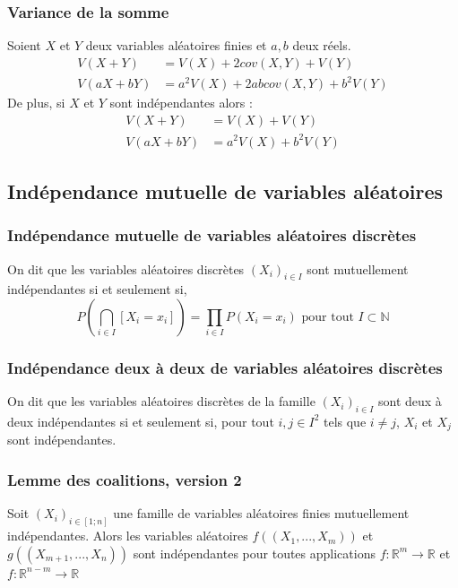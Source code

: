         \subsubsection{Variance de la somme}
            Soient $X$ et $Y$ deux variables aléatoires finies et $a, b$ deux réels.
            \begin{align*}
                V(X + Y) &= V(X) + 2cov(X, Y) + V(Y)\\
                V(aX + bY) &= a^2V(X) + 2abcov(X, Y) + b^2V(Y)
            \end{align*}
            De plus, si $X$ et $Y$ sont indépendantes alors :
            \begin{align*}
                V(X + Y) &= V(X) + V(Y)\\
                V(aX + bY) &= a^2V(X) + b^2V(Y)
            \end{align*}

    \subsection{Indépendance mutuelle de variables aléatoires}

        \subsubsection{Indépendance mutuelle de variables aléatoires discrètes}
            On dit que les variables aléatoires discrètes $(X_i)_{i \in I}$ sont mutuellement indépendantes
            si et seulement si,
            \[
                P\left( \bigcap_{i \in I} [X_i = x_i] \right) = \prod_{i \in I} P(X_i = x_i) \text{ pour tout } I \subset \mathbb{N}
            \]

        \subsubsection{Indépendance deux à deux de variables aléatoires discrètes}
            On dit que les variables aléatoires discrètes de la famille $(X_i)_{i \in I}$ sont deux à deux indépendantes
            si et seulement si, pour tout $i, j \in I^2$ tels que $i \neq j$, $X_i$ et $X_j$ sont indépendantes.

        \subsubsection{Lemme des coalitions, version 2}
            Soit $(X_i)_{i \in [1; n]}$ une famille de variables aléatoires finies mutuellement indépendantes.
            Alors les variables aléatoires $f((X_1, ..., X_m))$ et $g((X_{m+1}, ..., X_n))$ sont indépendantes 
            pour toutes applications $f : \mathbb{R}^{m} \rightarrow \mathbb{R}$ et $f : \mathbb{R}^{{n-m}} \rightarrow \mathbb{R}$
        
